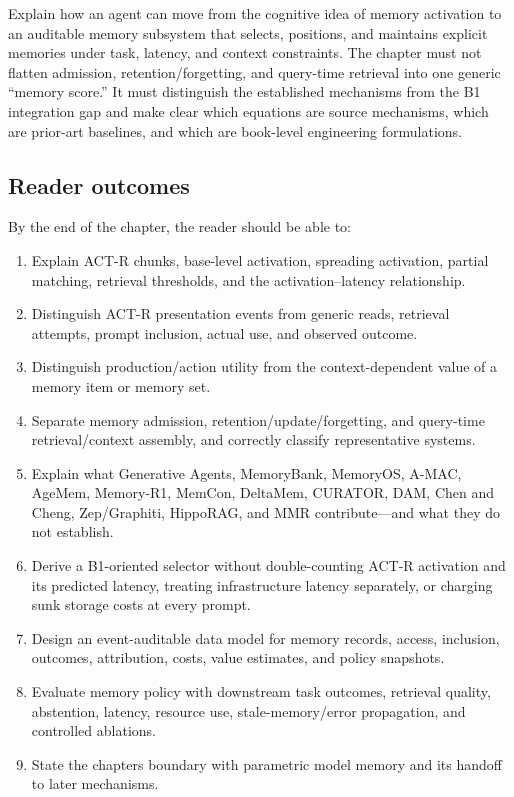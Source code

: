 Explain how an agent can move from the cognitive idea of memory activation to an auditable memory subsystem that selects, positions, and maintains explicit memories under task, latency, and context constraints. The chapter must not flatten admission, retention/forgetting, and query-time retrieval into one generic ``memory score.'' It must distinguish the established mechanisms from the B1 integration gap and make clear which equations are source mechanisms, which are prior-art baselines, and which are book-level engineering formulations.

\subsection{Reader outcomes}\label{reader-outcomes}

By the end of the chapter, the reader should be able to:

\begin{enumerate}
\def\labelenumi{\arabic{enumi}.}
\tightlist
\item
  Explain ACT-R chunks, base-level activation, spreading activation, partial matching, retrieval thresholds, and the activation--latency relationship.
\item
  Distinguish ACT-R presentation events from generic reads, retrieval attempts, prompt inclusion, actual use, and observed outcome.
\item
  Distinguish production/action utility from the context-dependent value of a memory item or memory set.
\item
  Separate memory admission, retention/update/forgetting, and query-time retrieval/context assembly, and correctly classify representative systems.
\item
  Explain what Generative Agents, MemoryBank, MemoryOS, A-MAC, AgeMem, Memory-R1, MemCon, DeltaMem, CURATOR, DAM, Chen and Cheng, Zep/Graphiti, HippoRAG, and MMR contribute---and what they do not establish.
\item
  Derive a B1-oriented selector without double-counting ACT-R activation and its predicted latency, treating infrastructure latency separately, or charging sunk storage costs at every prompt.
\item
  Design an event-auditable data model for memory records, access, inclusion, outcomes, attribution, costs, value estimates, and policy snapshots.
\item
  Evaluate memory policy with downstream task outcomes, retrieval quality, abstention, latency, resource use, stale-memory/error propagation, and controlled ablations.
\item
  State the chapter\textquotesingle s boundary with parametric model memory and its handoff to later mechanisms.
\end{enumerate}

